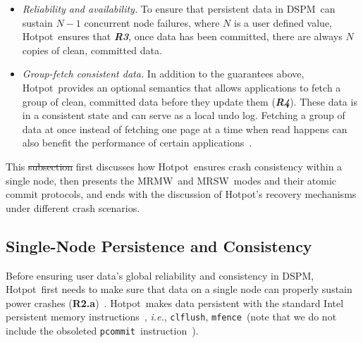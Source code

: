 \documentclass[sigconf]{acmart}
\renewcommand{\em}{\it}
\newcommand{\ie}{\textit{i.e.}}
\newcommand{\dsnvm}{DSPM}
\newcommand{\hotpot}{Hotpot}
\newcommand{\mrmw}{MRMW}
\newcommand{\mrsw}{MRSW}
\newcommand{\clflush}{\texttt{clflush}}
\newcommand{\pcommit}{\texttt{pcommit}}
\newcommand{\mfence}{\texttt{mfence}}
\newcommand{\rcs}{\textbf{R2.a}}
\newcommand{\re}{\textbf{R3}}
\newcommand{\rf}{\textbf{R4}}
\providecommand{\DIFadd}[1]{{\protect\color{blue}\uwave{#1}}} %
\providecommand{\DIFdel}[1]{{\protect\color{red}\sout{#1}}}                      %
\providecommand{\DIFaddbegin}{} %
\providecommand{\DIFaddend}{} %
\providecommand{\DIFdelbegin}{} %
\providecommand{\DIFdelend}{} %
\begin{document}
{\begin{itemize} [leftmargin=*]
\DIFdelbegin %
\DIFdelend \item{\em Reliability and availability.} 
To ensure that persistent data in \dsnvm\ can sustain $N-1$ concurrent node failures, 
where $N$ is a user defined value, \hotpot\ ensures that {\em \re}, once data has 
been committed, there are always $N$ copies of clean, committed data.

\DIFdelbegin %
\DIFdelend \item{\em Group-fetch consistent data.}
In addition to the guarantees above, \hotpot\ provides an optional semantics
that allows applications to fetch a group of clean, committed data before they update them ({\em \rf}).
These data is in a consistent state and can serve as a local undo log.
Fetching a group of data at once instead of fetching one page at a time when read happens 
can also benefit the performance of certain applications~\cite{HowardEtAl88-AFS}.
\fi

 \end{itemize} 
\DIFdelbegin %
\DIFdelend 

This \DIFdelbegin \DIFdel{subsection }\DIFdelend \DIFaddbegin \DIFadd{section }\DIFaddend first discusses how \hotpot\ ensures crash consistency within a single node,
then presents the \mrmw\ and \mrsw\ modes and their atomic commit protocols, %
and ends with the discussion of \hotpot's recovery mechanisms under different crash scenarios.

\DIFdelbegin %
\DIFdelend \DIFaddbegin \subsection{Single-Node Persistence and Consistency}
\DIFaddend \label{sec:singleconsistency}
\DIFdelbegin %
\DIFdelend \DIFaddbegin 

\DIFaddend Before ensuring user data's global reliability and consistency in \dsnvm,
\hotpot\ first needs to make sure that data on a single node can properly sustain power crashes (\rcs)~\cite{Memory-Persistency}.
\hotpot\ makes data persistent with the standard Intel persistent memory instructions~\cite{Delegated-persist},
\ie, \clflush, \mfence\ (note that we do not include the obsoleted \pcommit\ instruction~\cite{Deprecating-PCOMMIT}).

}
\end{document}
